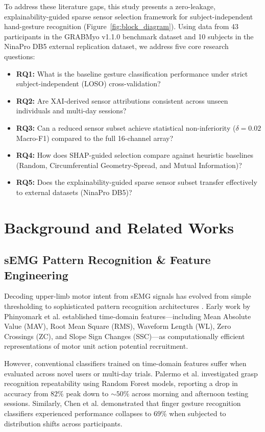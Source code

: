 \documentclass[final,5p,times,twocolumn]{elsarticle}
\begin{document}
To address these literature gaps, this study presents a zero-leakage, explainability-guided sparse sensor selection framework for subject-independent hand-gesture recognition (Figure~\ref{fig:block_diagram}). Using data from 43 participants in the GRABMyo v1.1.0 benchmark dataset and 10 subjects in the NinaPro DB5 external replication dataset, we address five core research questions:
\begin{itemize}
    \item \textbf{RQ1:} What is the baseline gesture classification performance under strict subject-independent (LOSO) cross-validation?
    \item \textbf{RQ2:} Are XAI-derived sensor attributions consistent across unseen individuals and multi-day sessions?
    \item \textbf{RQ3:} Can a reduced sensor subset achieve statistical non-inferiority ($\delta = 0.02$ Macro-F1) compared to the full 16-channel array?
    \item \textbf{RQ4:} How does SHAP-guided selection compare against heuristic baselines (Random, Circumferential Geometry-Spread, and Mutual Information)?
    \item \textbf{RQ5:} Does the explainability-guided sparse sensor subset transfer effectively to external datasets (NinaPro DB5)?
\end{itemize}

\section{Background and Related Works}

\subsection{sEMG Pattern Recognition & Feature Engineering}
Decoding upper-limb motor intent from sEMG signals has evolved from simple thresholding to sophisticated pattern recognition architectures \cite{14,15}. Early work by Phinyomark et al. \cite{Phinyomark2012} established time-domain features—including Mean Absolute Value (MAV), Root Mean Square (RMS), Waveform Length (WL), Zero Crossings (ZC), and Slope Sign Changes (SSC)—as computationally efficient representations of motor unit action potential recruitment.

However, conventional classifiers trained on time-domain features suffer when evaluated across novel users or multi-day trials. Palermo et al. \cite{16} investigated grasp recognition repeatability using Random Forest models, reporting a drop in accuracy from $82\%$ peak down to $\sim 50\%$ across morning and afternoon testing sessions. Similarly, Chen et al. \cite{s20030672} demonstrated that finger gesture recognition classifiers experienced performance collapses to $69\%$ when subjected to distribution shifts across participants.
\end{document}

